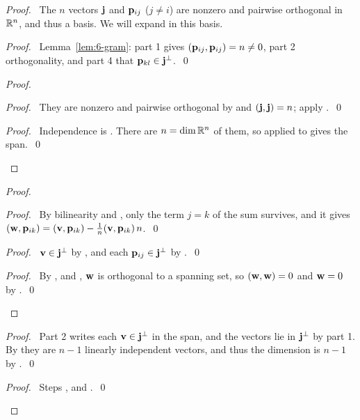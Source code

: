 \begin{proof}
 \pfsketch\ The $n$ vectors ${\mathbf j}$ and ${\mathbf p}_{ij}$ ($j\neq i$) are nonzero and pairwise orthogonal
 in ${\mathbb R}^n$, and thus a basis. We will expand in this basis.
 \begin{proof}\pf\ Lemma~\ref{lem:6-gram}: part 1 gives $({\mathbf p}_{ij},{\mathbf p}_{ij})=n\neq0$, part 2
  orthogonality, and part 4 that ${\mathbf p}_{kl}\in{\mathbf j}^\perp$.~\qed\end{proof}
 \begin{proof}
  \begin{proof}\pf\ They are nonzero and pairwise orthogonal by  and
   $({\mathbf j},{\mathbf j})=n$; apply .~\qed\end{proof}
  \qedstep
  \begin{proof}\pf\ Independence is . There are $n=\dim{\mathbb R}^n$ of them, so
    applied to  gives
   the span.~\qed\end{proof}
 \end{proof}
 \begin{proof}
  \begin{proof}\pf\ By bilinearity and , only the term $j=k$ of the sum
   survives, and it gives $({\mathbf w},{\mathbf p}_{ik})=({\mathbf v},{\mathbf p}_{ik})-\frac1n({\mathbf v},{\mathbf p}_{ik})\,n$.~\qed
  \end{proof}
  \begin{proof}\pf\ ${\mathbf v}\in{\mathbf j}^\perp$ by , and each ${\mathbf p}_{ij}\in{\mathbf j}^\perp$ by .~\qed
  \end{proof}
  \qedstep
  \begin{proof}\pf\ By ,  and , ${\mathbf w}$ is
   orthogonal to a spanning set, so $({\mathbf w},{\mathbf w})=0$ and ${\mathbf w}=0$ by .~\qed
  \end{proof}
 \end{proof}
 \begin{proof}\pf\ Part 2 writes each ${\mathbf v}\in{\mathbf j}^\perp$ in the span, and the vectors lie in ${\mathbf j}^\perp$ by
  part 1. By  they are $n-1$ linearly independent vectors, and thus
  the dimension is $n-1$
  by .~\qed\end{proof}
 \qedstep
 \begin{proof}\pf\ Steps ,  and .~\qed
 \end{proof}
\end{proof}

